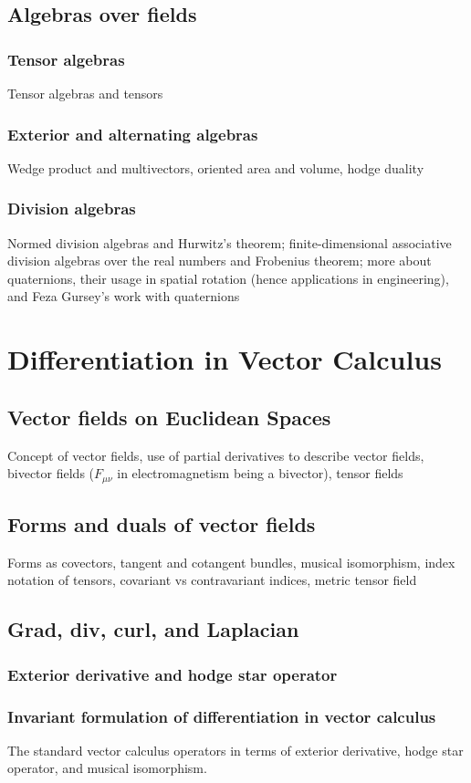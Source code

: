 \section{Algebras over fields}
\subsection{Tensor algebras}
Tensor algebras and tensors
\subsection{Exterior and alternating algebras}
Wedge product and multivectors, oriented area and volume, hodge duality

\subsection{Division algebras}
Normed division algebras and Hurwitz's theorem; finite-dimensional associative division algebras over the real numbers and Frobenius theorem; more about quaternions, their usage in spatial rotation (hence applications in engineering), and Feza Gursey's work with quaternions


\chapter{Differentiation in Vector Calculus}
\section{Vector fields on Euclidean Spaces}
Concept of vector fields, use of partial derivatives to describe vector fields, bivector fields ($F_{\mu\nu}$ in electromagnetism being a bivector), tensor fields
\section{Forms and duals of vector fields}
Forms as covectors, tangent and cotangent bundles, musical isomorphism, index notation of tensors, covariant vs contravariant indices, metric tensor field
\section{Grad, div, curl, and Laplacian}
\subsection{Exterior derivative and hodge star operator}
\subsection{Invariant formulation of differentiation in vector calculus}
The standard vector calculus operators in terms of exterior derivative, hodge star operator, and musical isomorphism.


